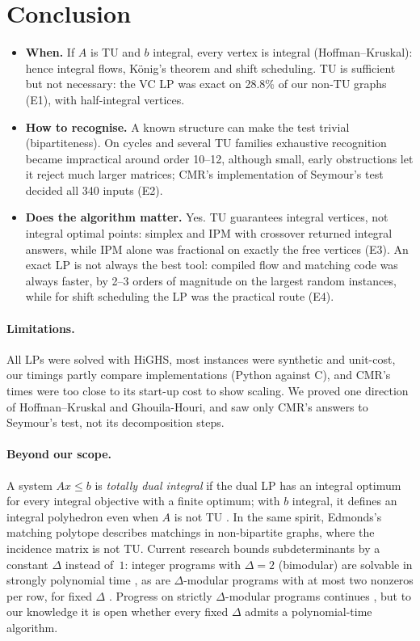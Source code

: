 \section{Conclusion}\label{sec:conclusion}

\begin{itemize}[topsep=0pt]
  \item \textbf{When.} If $A$ is TU and $b$ integral, every vertex is integral (Hoffman--Kruskal): hence integral flows, König's theorem and shift scheduling. TU is sufficient but not necessary: the VC LP was exact on 28.8\% of our non-TU graphs (E1), with half-integral vertices.
  \item \textbf{How to recognise.} A known structure can make the test trivial (bipartiteness). On cycles and several TU families exhaustive recognition became impractical around order 10--12, although small, early obstructions let it reject much larger matrices; CMR's implementation of Seymour's test decided all 340 inputs (E2).
  \item \textbf{Does the algorithm matter.} Yes. TU guarantees integral vertices, not integral optimal points: simplex and IPM with crossover returned integral answers, while IPM alone was fractional on exactly the free vertices (E3). An exact LP is not always the best tool: compiled flow and matching code was always faster, by 2--3 orders of magnitude on the largest random instances, while for shift scheduling the LP was the practical route (E4).
\end{itemize}

\paragraph{Limitations.} All LPs were solved with HiGHS, most instances were synthetic and unit-cost, our timings partly compare implementations (Python against C), and CMR's times were too close to its start-up cost to show scaling. We proved one direction of Hoffman--Kruskal and Ghouila-Houri, and saw only CMR's answers to Seymour's test, not its decomposition steps.

\paragraph{Beyond our scope.} A system $Ax\le b$ is \emph{totally dual integral} if the dual LP has an integral optimum for every integral objective with a finite optimum; with $b$ integral, it defines an integral polyhedron even when $A$ is not TU \cite{edmonds1977}. In the same spirit, Edmonds's matching polytope \cite{edmonds1965} describes matchings in non-bipartite graphs, where the incidence matrix is not TU. Current research bounds subdeterminants by a constant $\Delta$ instead of~$1$: integer programs with $\Delta=2$ (bimodular) are solvable in strongly polynomial time \cite{artmann2017}, as are $\Delta$-modular programs with at most two nonzeros per row, for fixed $\Delta$ \cite{fiorini2021}. Progress on strictly $\Delta$-modular programs continues \cite{nagele2024}, but to our knowledge it is open whether every fixed $\Delta$ admits a polynomial-time algorithm.
